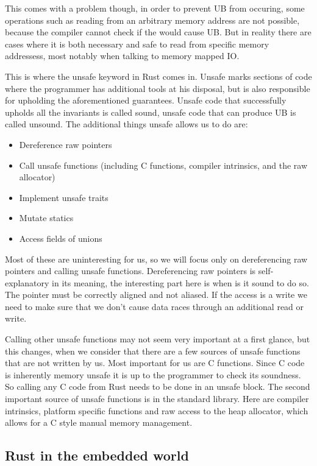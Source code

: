 This comes with a problem though, in order to prevent UB from occuring,
some operations such as reading from an arbitrary memory address are not possible,
because the compiler cannot check if the would cause UB.
But in reality there are cases where it is both necessary and safe to read from specific memory addressess,
most notably when talking to memory mapped IO.

This is where the unsafe keyword in Rust comes in.
Unsafe marks sections of code where the programmer has additional tools at his disposal, but is also responsible for upholding the aforementioned guarantees.
Unsafe code that successfully upholds all the invariants is called sound, unsafe code that can produce UB is called unsound.
The additional things unsafe allows us to do are:
\begin{itemize}
    \item Dereference raw pointers
    \item Call unsafe functions (including C functions, compiler intrinsics, and the raw allocator)
    \item Implement unsafe traits
    \item Mutate statics
    \item Access fields of unions
\end{itemize}

Most of these are uninteresting for us, so we will focus only on dereferencing raw pointers and calling unsafe functions.
Dereferencing raw pointers is self-explanatory in its meaning, the interesting part here is when is it sound to do so.
The pointer must be correctly aligned and not aliased.
If the access is a write we need to make sure that we don't cause data races through an additional read or write.

Calling other unsafe functions may not seem very important at a first glance,
but this changes, when we consider that there are a few sources of unsafe functions that are not written by us.
Most important for us are C functions.
Since C code is inherently memory unsafe it is up to the programmer to check its soundness.
So calling any C code from Rust needs to be done in an unsafe block.
The second important source of unsafe functions is in the standard library.
Here are compiler intrinsics, platform specific functions and raw access to the heap allocator, which allows for a C style manual memory management.

\subsection{Rust in the embedded world}
\label{sec:background:rust:embedded}

